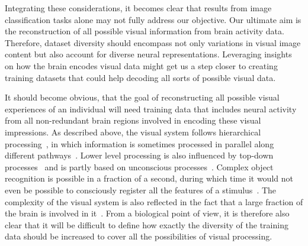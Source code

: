 Integrating these considerations, it becomes clear that results from image classification tasks alone may not fully address our objective. Our ultimate aim is the reconstruction of all possible visual information from brain activity data. Therefore, dataset diversity should encompass not only variations in visual image content but also account for diverse neural representations. Leveraging insights on how the brain encodes visual data might get us a step closer to creating training datasets that could help decoding all sorts of possible visual data. 

It should become obvious, that the goal of reconstructing all possible visual experiences of an individual will need training data that includes neural activity from all non-redundant brain regions involved in encoding these visual impressions. As described above, the visual system follows hierarchical processing~\cite{grill-spectorHUMANVISUALCORTEX2004,horikawaGenericDecodingSeen2017,kamitaniDecodingVisualSubjective2005}, in which information is sometimes processed in parallel along different pathways~\cite{ungerleiderWhatWhereHuman1994,kravitzNewNeuralFramework2011}. Lower level processing is also influenced by top-down processes~\cite{barTopdownFacilitationVisual2006,chengReconstructingVisualIllusory2023} and is partly based on unconscious processes~\cite{kravitzNewNeuralFramework2011}. Complex object recognition is possible in a fraction of a second, during which time it would not even be possible to consciously register all the features of a stimulus~\cite{dicarloHowDoesBrain2012}. The complexity of the visual system is also reflected in the fact that a large fraction of the brain is involved in it~\cite{fellemanDistributedHierarchicalProcessing1991a}. From a biological point of view, it is therefore also clear that it will be difficult to define how exactly the diversity of the training data should be increased to cover all the possibilities of visual processing.






